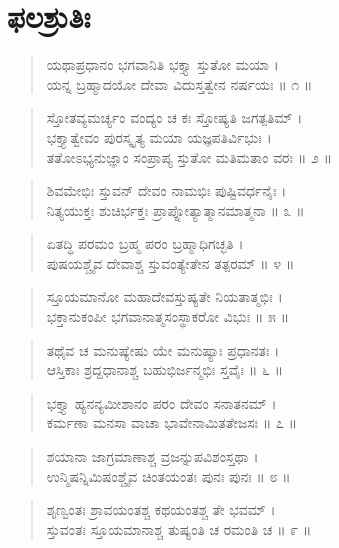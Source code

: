 
\chapter{ಫಲಶ್ರುತಿಃ}

\begin{verse}
ಯಥಾಪ್ರಧಾನಂ ಭಗವಾನಿತಿ ಭಕ್ತ್ಯಾ ಸ್ತುತೋ ಮಯಾ ।\\ಯನ್ನ ಬ್ರಹ್ಮಾದಯೋ ದೇವಾ ವಿದುಸ್ತತ್ವೇನ ನರ್ಷಯಃ \num{॥ ೧ ॥}
\end{verse}

\begin{verse}
ಸ್ತೋತವ್ಯಮರ್ಚ್ಯಂ ವಂದ್ಯಂ ಚ ಕಃ ಸ್ತೋಷ್ಯತಿ ಜಗತ್ಪತಿಮ್ ।\\ಭಕ್ತ್ಯಾತ್ವೇವಂ ಪುರಸ್ಕೃತ್ಯ ಮಯಾ ಯಜ್ಞಪತಿರ್ವಿಭುಃ ।\\ತತೋಽಭ್ಯನುಜ್ಞಾಂ ಸಂಪ್ರಾಪ್ಯ ಸ್ತುತೋ ಮತಿಮತಾಂ ವರಃ \num{॥ ೨ ॥}
\end{verse}

\begin{verse}
ಶಿವಮೇಭಿಃ ಸ್ತುವನ್ ದೇವಂ ನಾಮಭಿಃ ಪುಷ್ಟಿವರ್ಧನೈಃ ।\\ನಿತ್ಯಯುಕ್ತಃ ಶುಚಿರ್ಭಕ್ತಃ ಪ್ರಾಪ್ನೋತ್ಯಾತ್ಮಾನಮಾತ್ಮನಾ \num{॥ ೩ ॥}
\end{verse}

\begin{verse}
ಏತದ್ಧಿ ಪರಮಂ ಬ್ರಹ್ಮ ಪರಂ ಬ್ರಹ್ಮಾಧಿಗಚ್ಛತಿ ।\\ಪುಷಯಶ್ಚೈವ ದೇವಾಶ್ಚ ಸ್ತುವಂತ್ಯೇತೇನ ತತ್ಪರಮ್ \num{॥ ೪ ॥}
\end{verse}

\begin{verse}
ಸ್ತೂಯಮಾನೋ ಮಹಾದೇವಸ್ತುಷ್ಯತೇ ನಿಯತಾತ್ಮಭಿಃ ।\\ಭಕ್ತಾನುಕಂಪೀ ಭಗವಾನಾತ್ಮಸಂಸ್ಥಾಕರೋ ವಿಭುಃ \num{॥ ೫ ॥}
\end{verse}

\begin{verse}
ತಥೈವ ಚ ಮನುಷ್ಯೇಷು ಯೇ ಮನುಷ್ಯಾಃ ಪ್ರಧಾನತಃ ।\\ಆಸ್ತಿಕಾಃ ಶ್ರದ್ದಧಾನಾಶ್ಚ ಬಹುಭಿರ್ಜನ್ಮಭಿಃ ಸ್ತವೈಃ \num{॥ ೬ ॥}
\end{verse}

\begin{verse}
ಭಕ್ತ್ಯಾ ಹ್ಯನನ್ಯಮೀಶಾನಂ ಪರಂ ದೇವಂ ಸನಾತನಮ್ ।\\ಕರ್ಮಣಾ ಮನಸಾ ವಾಚಾ ಭಾವೇನಾಮಿತತೇಜಸಃ \num{॥ ೭ ॥}
\end{verse}

\begin{verse}
ಶಯಾನಾ ಜಾಗ್ರಮಾಣಾಶ್ಚ ವ್ರಜನ್ನುಪವಿಶಂಸ್ತಥಾ ।\\ಉನ್ಮಿಷನ್ನಿಮಿಷಂಶ್ಚೈವ ಚಿಂತಯಂತಃ ಪುನಃ ಪುನಃ \num{॥ ೮ ॥}
\end{verse}

\begin{verse}
ಶೃಣ್ವಂತಃ ಶ್ರಾವಯಂತಶ್ಚ ಕಥಯಂತಶ್ಚ ತೇ ಭವಮ್ ।\\ಸ್ತುವಂತಃ ಸ್ತೂಯಮಾನಾಶ್ಚ ತುಷ್ಯಂತಿ ಚ ರಮಂತಿ ಚ \num{॥ ೯ ॥}
\end{verse}

